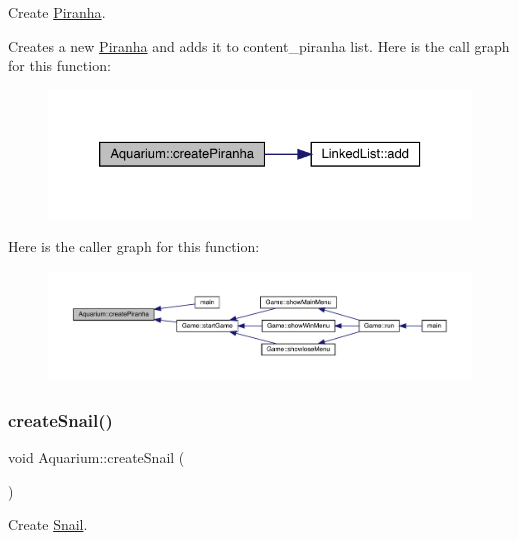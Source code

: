 Create \mbox{\hyperlink{class_piranha}{Piranha}}. 

Creates a new \mbox{\hyperlink{class_piranha}{Piranha}} and adds it to content\+\_\+piranha list. Here is the call graph for this function\+:\nopagebreak
\begin{figure}[H]
\begin{center}
\leavevmode
\includegraphics[width=326pt]{class_aquarium_a416b16bc7c252260b9cbe053a6e5a76c_cgraph}
\end{center}
\end{figure}
Here is the caller graph for this function\+:
\nopagebreak
\begin{figure}[H]
\begin{center}
\leavevmode
\includegraphics[width=350pt]{class_aquarium_a416b16bc7c252260b9cbe053a6e5a76c_icgraph}
\end{center}
\end{figure}
\mbox{\label{class_aquarium_ae631c3fd8587b1889ffea4e0ade6359e}} 
\subsubsection{\texorpdfstring{create\+Snail()}{createSnail()}}
{\footnotesize\ttfamily void Aquarium\+::create\+Snail (\begin{DoxyParamCaption}{ }\end{DoxyParamCaption})}



Create \mbox{\hyperlink{class_snail}{Snail}}. 

